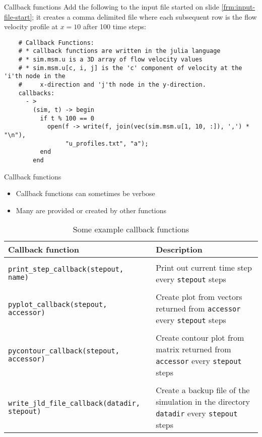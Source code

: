 \documentclass[pdf]{beamer}
\begin{document}
\begin{frame}[fragile]{Callback functions}
  Add the following to the input file started on slide \ref{frm:input-file-start}; it creates a comma delimited file where each subsequent row is the flow velocity profile at $x = 10$ after 100 time steps:
  \tiny
  \begin{verbatim}
    # Callback Functions:
    # * callback functions are written in the julia language
    # * sim.msm.u is a 3D array of flow velocity values
    # * sim.msm.u[c, i, j] is the 'c' component of velocity at the 'i'th node in the 
    #     x-direction and 'j'th node in the y-direction.
    callbacks:
      - >
        (sim, t) -> begin
          if t % 100 == 0
            open(f -> write(f, join(vec(sim.msm.u[1, 10, :]), ',') * "\n"), 
                 "u_profiles.txt", "a");
          end
        end
  \end{verbatim}
\end{frame}

\begin{frame}{Callback functions}
  \begin{itemize}
    \item Callback functions can sometimes be verbose
    \item Many are provided or created by other functions
  \end{itemize}

  \begin{table}
    \tiny
    \centering
    \caption{Some example callback functions}
    \begin{tabularx}{\textwidth}{l X}
      \textbf{Callback function} & \textbf{Description} \\
      \hline \\
      \texttt{print\_step\_callback(stepout, name)} & Print out current time step every \texttt{stepout} steps \\
      \\
      \texttt{pyplot\_callback(stepout, accessor)} & Create plot from vectors returned from \texttt{accessor} every \texttt{stepout} steps \\
      \\
      \texttt{pycontour\_callback(stepout, accessor)} & Create contour plot from matrix returned from \texttt{accessor} every \texttt{stepout} steps \\
      \\
      \texttt{write\_jld\_file\_callback(datadir, stepout)} & Create a backup file of the simulation in the directory \texttt{datadir} every \texttt{stepout} steps \\
    \end{tabularx}
  \end{table}

\end{frame}
\end{document}
